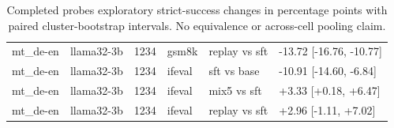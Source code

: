 \begin{table}[t]
\begin{tabular}{llllll}
mt\_de-en & llama32-3b & 1234 & gsm8k & replay vs sft & -13.72 [-16.76, -10.77] \\
mt\_de-en & llama32-3b & 1234 & ifeval & sft vs base & -10.91 [-14.60, -6.84] \\
mt\_de-en & llama32-3b & 1234 & ifeval & mix5 vs sft & +3.33 [+0.18, +6.47] \\
mt\_de-en & llama32-3b & 1234 & ifeval & replay vs sft & +2.96 [-1.11, +7.02] \\
\bottomrule
\end{tabular}
\caption{Completed probes exploratory strict-success changes in percentage points with paired cluster-bootstrap intervals. No equivalence or across-cell pooling claim.}
\end{table}
